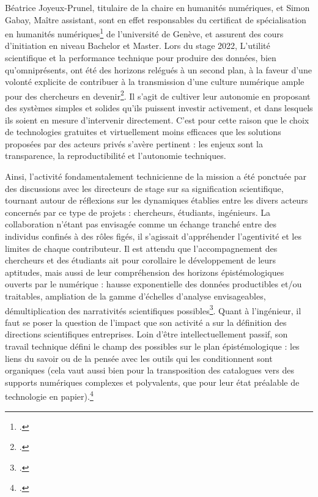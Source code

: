 \documentclass[a4paper,12pt,twoside]{book}
\begin{document}
Béatrice Joyeux-Prunel, titulaire de la chaire en humanités numériques, et Simon Gabay, Maître assistant, sont en effet responsables du certificat de spécialisation en humanités numériques\footcite{universitedegeneveCertificatSpecialisationHumanites} de l'université de Genève, et assurent des cours d'initiation en niveau Bachelor et Master. Lors du stage 2022, L'utilité scientifique et la performance technique pour produire des données, bien qu'omniprésents, ont été des horizons relégués à un second plan, à la faveur d'une volonté explicite de contribuer à la transmission d'une culture numérique ample pour des chercheurs en devenir\footcite{kaufmannEnseignementSHSEstil2019}. Il s'agit de cultiver leur autonomie en proposant des systèmes simples et solides qu'ils puissent investir activement, et dans lesquels ils soient en mesure d'intervenir directement. C'est pour cette raison que le choix de technologies gratuites et virtuellement moins efficaces que les solutions proposées par des acteurs privés s'avère pertinent : les enjeux sont la transparence, la reproductibilité et l'autonomie techniques. 

Ainsi, l'activité fondamentalement technicienne de la mission a été ponctuée par des discussions avec les directeurs de stage sur sa signification scientifique, tournant autour de réflexions sur les dynamiques établies entre les divers acteurs concernés par ce type de projets : chercheurs, étudiants, ingénieurs. La collaboration n'étant pas envisagée comme un échange tranché entre des individus confinés à des rôles figés, il s'agissait d'appréhender l'agentivité et les limites de chaque contributeur. Il est attendu que l'accompagnement des chercheurs et des étudiants ait pour corollaire le développement de leurs aptitudes, mais aussi de leur compréhension des horizons épistémologiques ouverts par le numérique : hausse exponentielle des données productibles et/ou traitables, ampliation de la gamme d'échelles d'analyse envisageables, démultiplication des narrativités scientifiques possibles\footcite{joyeux-prunelArtMesureHistoire2022, joyeux-prunelHistoireArtQuantitatif2008}. Quant à l'ingénieur, il faut se poser la question de l'impact que son activité a sur la définition des directions scientifiques entreprises. Loin d'être intellectuellement passif, son travail technique défini le champ des possibles sur le plan épistémologique : les liens du savoir ou de la pensée avec les outils qui les conditionnent sont organiques (cela vaut aussi bien pour la transposition des catalogues vers des supports numériques complexes et polyvalents, que pour leur état préalable de technologie en papier).\footcite{jacobLieuxSavoirMains2010, hauchecorneHumanitesScientifiquesSelon2012}
\end{document}
